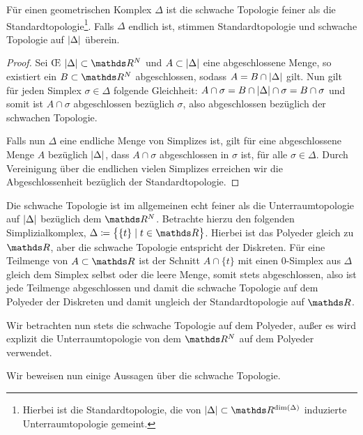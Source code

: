 \begin{Lem}
  Für einen geometrischen Komplex $\Delta$ ist die schwache Topologie
  feiner als die Standardtopologie\footnote{Hierbei ist die
    Standardtopologie, die von $\gr{\Delta} \subset \R^{\dim(\Delta)}$
    induzierte Unterraumtopologie gemeint.}. Falls $\Delta$ endlich
  ist, stimmen Standardtopologie und schwache Topologie auf
  $\left| \Delta \right|$ überein.
  \begin{proof}
    Sei \OE\; $\gr{\Delta} \subset \R^N$ und $A \subset \left| \Delta \right|$
    eine abgeschlossene Menge, so existiert ein $B \subset \R^N$
    abgeschlossen, sodass $A = B \cap \left| \Delta \right|$ gilt. Nun gilt für
    jeden Simplex $\sigma \in \Delta$ folgende Gleichheit:
    $A \cap \sigma = B \cap \left| \Delta \right| \cap \sigma = B \cap \sigma$
    und somit ist $A \cap \sigma$ abgeschlossen bezüglich $\sigma$,
    also abgeschlossen bezüglich der schwachen Topologie.
		
    Falls nun $\Delta$ eine endliche Menge von Simplizes ist, gilt für
    eine abgeschlossene Menge $A$ bezüglich $\left| \Delta \right|$, dass
    $A \cap \sigma$ abgeschlossen in $\sigma$ ist, für alle
    $\sigma \in \Delta$. Durch Vereinigung über die endlichen vielen
    Simplizes erreichen wir die Abgeschlossenheit bezüglich der
    Standardtopologie.
  \end{proof}
\end{Lem}

\begin{Bem}
  Die schwache Topologie ist im allgemeinen echt feiner als die
  Unterraumtopologie auf $\left| \Delta \right|$ bezüglich dem $\R^N$. Betrachte
  hierzu den folgenden Simplizialkomplex,
  $\Delta \coloneqq \set{ \{t\} }{t \in \R}$.  Hierbei ist das
  Polyeder gleich zu $\R$, aber die schwache Topologie entspricht der
  Diskreten. Für eine Teilmenge von $A \subset \R$ ist der Schnitt
  $A \cap \{ t \}$ mit einen $0$-Simplex aus $\Delta$ gleich dem
  Simplex selbst oder die leere Menge, somit stets abgeschlossen, also
  ist jede Teilmenge abgeschlossen und damit die schwache Topologie
  auf dem Polyeder der Diskreten und damit ungleich der
  Standardtopologie auf $\R$.
\end{Bem}

Wir betrachten nun stets die schwache Topologie auf dem Polyeder,
außer es wird explizit die Unterraumtopologie von dem $\R^N$ auf dem
Polyeder verwendet.

Wir beweisen nun einige Aussagen über die schwache Topologie.

